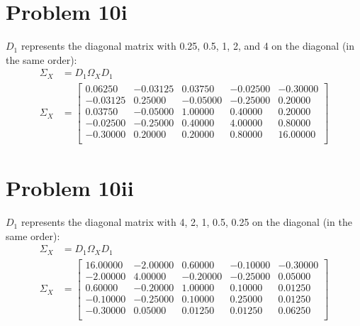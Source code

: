 \documentclass{article}
\begin{document}
\section*{Problem 10i}
\(D_{1}\) represents the diagonal matrix with 0.25, 0.5, 1, 2, and 4 on the diagonal (in the same order):
\begin{equation*}
\begin{aligned}
\Sigma_X &= D_{1}\Omega_{X}D_{1} \\
\Sigma_X &=
\begin{bmatrix}{}
  0.06250 & -0.03125 & 0.03750 & -0.02500 & -0.30000 \\ 
  -0.03125 & 0.25000 & -0.05000 & -0.25000 & 0.20000 \\ 
  0.03750 & -0.05000 & 1.00000 & 0.40000 & 0.20000 \\ 
  -0.02500 & -0.25000 & 0.40000 & 4.00000 & 0.80000 \\ 
  -0.30000 & 0.20000 & 0.20000 & 0.80000 & 16.00000 \\ 
  \end{bmatrix}
\end{aligned}
\end{equation*}

\section*{Problem 10ii}
\(D_{1}\) represents the diagonal matrix with 4, 2, 1, 0.5, 0.25 on the diagonal (in the same order):
\begin{equation*}
\begin{aligned}
\Sigma_X &= D_{1}\Omega_{X}D_{1} \\
\Sigma_X &=
\begin{bmatrix}{}
  16.00000 & -2.00000 & 0.60000 & -0.10000 & -0.30000 \\ 
  -2.00000 & 4.00000 & -0.20000 & -0.25000 & 0.05000 \\ 
  0.60000 & -0.20000 & 1.00000 & 0.10000 & 0.01250 \\ 
  -0.10000 & -0.25000 & 0.10000 & 0.25000 & 0.01250 \\ 
  -0.30000 & 0.05000 & 0.01250 & 0.01250 & 0.06250 \\ 
  \end{bmatrix}
\end{aligned}
\end{equation*}
\end{document}
